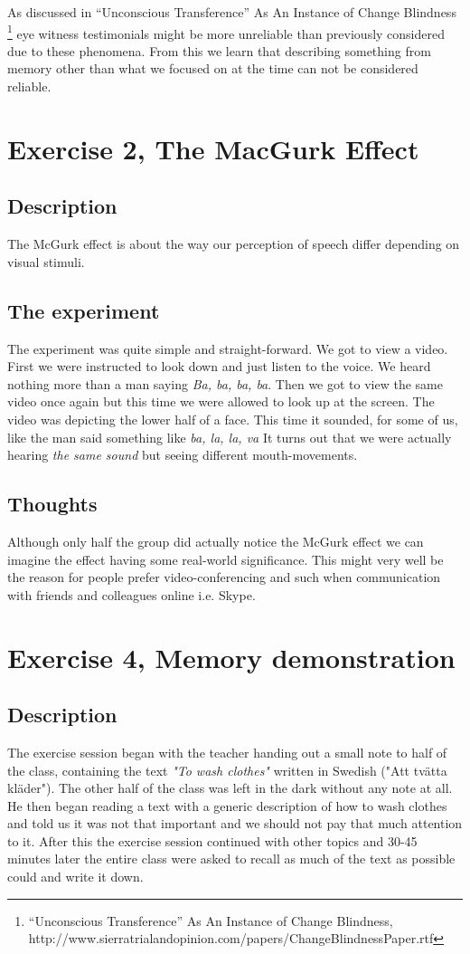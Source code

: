 \documentclass[10pt, a4paper]{article}
\begin{document}
As discussed in “Unconscious Transference” As An Instance of Change Blindness \footnote{“Unconscious Transference” As An Instance of Change Blindness, http://www.sierratrialandopinion.com/papers/ChangeBlindnessPaper.rtf} eye witness testimonials might be more unreliable than previously considered due to these phenomena. From this we learn that describing something from memory other than what we focused on at the time can not be considered reliable. 

\section{Exercise 2, The MacGurk Effect}
\subsection{Description}
The McGurk effect is about the way our perception of speech differ depending on visual stimuli.

\subsection{The experiment}
The experiment was quite simple and straight-forward.  We got to view a video. First we were instructed to look down and just listen to the voice.  We heard nothing more than a man saying \emph{Ba, ba, ba, ba}.  Then we got to view the same video once again but this time we were allowed to look up at the screen.  The video was depicting the lower half of a face.  This time it sounded, for some of us,  like the man said something like \emph{ba, la, la, va} It turns out that we were actually hearing \emph{the same sound} but seeing different mouth-movements.

\subsection{Thoughts}
Although only half the group did actually notice the McGurk effect we can imagine the effect having some real-world significance. This might very well be the reason for people prefer video-conferencing and such when communication with friends and colleagues online i.e. Skype.

\section{Exercise 4, Memory demonstration}
\subsection{Description}
The exercise session began with the teacher handing out a small note to half of the class, containing the text \emph{"To wash clothes"} written in Swedish ("Att tvätta kläder"). The other half of the class was left in the dark without any note at all. He then began reading a text with a generic description of how to wash clothes and told us it was not that important and we should not pay that much attention to it. After this the exercise session continued with other topics and 30-45 minutes later the entire class were asked to recall as much of the text as possible could and write it down.
\end{document}
